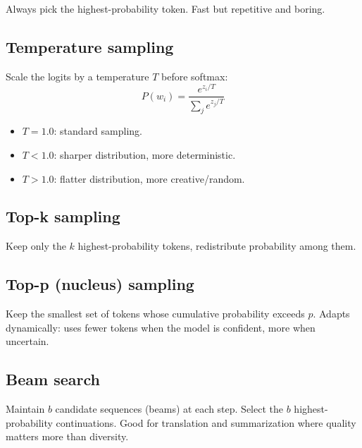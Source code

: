 Always pick the highest-probability token. Fast but repetitive and boring.

\subsection{Temperature sampling}

Scale the logits by a temperature $T$ before softmax:
\[
P(w_i) = \frac{e^{z_i / T}}{\sum_j e^{z_j / T}}
\]
\begin{itemize}
  \item $T = 1.0$: standard sampling.
  \item $T < 1.0$: sharper distribution, more deterministic.
  \item $T > 1.0$: flatter distribution, more creative/random.
\end{itemize}

\subsection{Top-k sampling}

Keep only the $k$ highest-probability tokens, redistribute probability among them.

\subsection{Top-p (nucleus) sampling}

Keep the smallest set of tokens whose cumulative probability exceeds $p$. Adapts dynamically: uses fewer tokens when the model is confident, more when uncertain.

\subsection{Beam search}

Maintain $b$ candidate sequences (beams) at each step. Select the $b$ highest-probability continuations. Good for translation and summarization where quality matters more than diversity.

